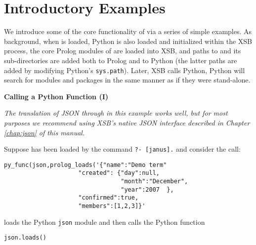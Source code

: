 

\section{Introductory Examples}

We introduce some of the core functionality of \janusplg{} via a
series of simple examples.  As background, when \janus{} is loaded,
Python is also loaded and initialized within the XSB process, the core
Prolog modules of \janus{} are loaded into XSB, and paths to \janus{}
and its sub-directories are added both to Prolog and to Python (the
latter paths are added by modifying Python's {\tt sys.path}). Later,
XSB calls Python, Python will search for modules and packages in the
same manner as if they were stand-alone.

\begin{example} \rm {\bf Calling a Python Function (I)} \label{ex:janus-json}

  {{\em The translation of JSON through \janusplg{} in this example
      works well, but for most purposes we recommend using XSB's native
      JSON interface described in Chapter \ref{chap:json} of this
      manual.  }}

Suppose \janus{} has been loaded by the command {\tt ?- [janus].} and
consider the call:

\begin{verbatim}
py_func(json,prolog_loads('{"name":"Demo term"
                     "created": {"day":null,
                                 "month":"December",
                                 "year":2007  },
                     "confirmed":true,
                     "members":[1,2,3]}'
\end{verbatim}
 
\noindent 
loads the Python {\tt json} module
and then calls the Python function

{\tt json.loads()}


\end{example}
